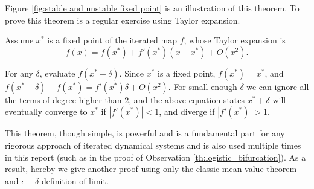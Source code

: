 Figure \ref{fig:stable and unstable fixed point} is an illustration of this theorem.
To prove this theorem is a regular exercise using Taylor expansion. 

Assume $x^*$ is a fixed point of the iterated map $f$, whose Taylor expansion is
$$f(x) = f(x^*) + f'(x^*) (x - x^*) + O(x^2).$$

For any $\delta$, evaluate $f(x^* + \delta)$.
Since $x^*$ is a fixed point,
 $f(x^*) = x^*$, and
 $f(x^* + \delta) - f(x^*) = f'(x^*) \delta + O(x^2)$. 
For small enough $\delta$ we can ignore all the terms of degree higher than $2$, and the above equation states $x^*+ \delta$ will eventually converge to $x^*$ if $|f'(x^*)| < 1$, and diverge if $|f'(x^*)| > 1$.

This theorem, though simple, is powerful and is a fundamental part for any rigorous approach of iterated dynamical systems and is also used multiple times in this report (such as in the proof of Observation \ref{th:logistic_bifurcation}). 
As a result, hereby we give another proof using only the classic mean value theorem and $\epsilon-\delta$ definition of limit.

